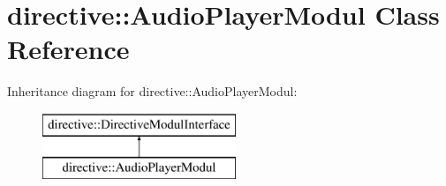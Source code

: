 \hypertarget{classdirective_1_1AudioPlayerModul}{}\section{directive\+:\+:Audio\+Player\+Modul Class Reference}
\label{classdirective_1_1AudioPlayerModul}
Inheritance diagram for directive\+:\+:Audio\+Player\+Modul\+:\begin{figure}[H]
\begin{center}
\leavevmode
\includegraphics[height=2.000000cm]{d2/df2/classdirective_1_1AudioPlayerModul}
\end{center}
\end{figure}
